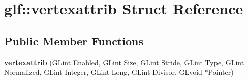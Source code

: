 \hypertarget{structglf_1_1vertexattrib}{\section{glf\-:\-:vertexattrib \-Struct \-Reference}
\label{structglf_1_1vertexattrib}
}
\subsection*{\-Public \-Member \-Functions}
\begin{DoxyCompactItemize}
\item 
\hypertarget{structglf_1_1vertexattrib_a70a3e63729fa929fdb37419e164fe478}{{\bfseries vertexattrib} (\-G\-Lint \-Enabled, \-G\-Lint \-Size, \-G\-Lint \-Stride, \-G\-Lint \-Type, \-G\-Lint \-Normalized, \-G\-Lint \-Integer, \-G\-Lint \-Long, \-G\-Lint \-Divisor, \-G\-Lvoid $\ast$\-Pointer)}\label{structglf_1_1vertexattrib_a70a3e63729fa929fdb37419e164fe478}

\end{DoxyCompactItemize}
